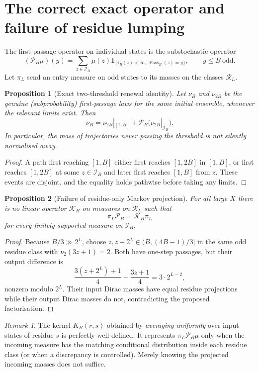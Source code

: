 \documentclass[10pt]{amsart}
\newtheorem{proposition}{Proposition}
\theoremstyle{definition}\newtheorem{definition}{Definition}
\theoremstyle{remark}\newtheorem{remark}{Remark}
\newcommand{\Pass}{\operatorname{Pass}}
\newcommand{\one}{\mathbf 1}
\newcommand{\cI}{\mathcal I}
\newcommand{\cR}{\mathcal R}
\newcommand{\cP}{\mathcal P}
\begin{document}
\section{The correct exact operator and failure of residue lumping}
The first-passage operator on individual states is the substochastic operator
\begin{equation}\label{eq:fulloperator}
 (\cP_B\mu)(y)=\sum_{z\in\cI_B}\mu(z)
 \one_{\{\tau_B(z)<\infty,\ \Pass_B(z)=y\}},\qquad y\le B\ \mathrm{odd}.
\end{equation}
Let $\pi_L$ send an entry measure on odd states to its masses on the classes $\cR_L$.

\begin{proposition}[Exact two-threshold renewal identity]\label{prop:renew}
Let $\nu_B$ and $\nu_{2B}$ be the genuine (subprobability) first-passage laws for the same initial ensemble, whenever the relevant limits exist. Then
\begin{equation}\label{eq:renew}
 \nu_B=\nu_{2B}|_{[1,B]}+\cP_B\bigl(\nu_{2B}|_{\cI_B}\bigr).
\end{equation}
In particular, the mass of trajectories never passing the threshold is not silently normalised away.
\end{proposition}
\begin{proof}
A path first reaching $[1,B]$ either first reaches $[1,2B]$ in $[1,B]$, or first reaches $[1,2B]$ at some $z\in\cI_B$ and later first reaches $[1,B]$ from $z$. These events are disjoint, and the equality holds pathwise before taking any limits.
\end{proof}

\begin{proposition}[Failure of residue-only Markov projection]\label{prop:lump}
For all large $X$ there is no linear operator $\mathcal K_B$ on measures on $\cR_L$ such that
\[
 \pi_L\cP_B=\mathcal K_B\pi_L
\]
for every finitely supported measure on $\cI_B$.
\end{proposition}
\begin{proof}
Because $B/3\gg 2^L$, choose $z,z+2^L\in(B,(4B-1)/3]$ in the same odd residue class with $\nu_2(3z+1)=2$. Both have one-step passages, but their output difference is
\[
 \frac{3(z+2^L)+1}{4}-\frac{3z+1}{4}=3\cdot2^{L-2},
\]
nonzero modulo $2^L$. Their input Dirac masses have equal residue projections while their output Dirac masses do not, contradicting the proposed factorisation.
\end{proof}
\begin{remark}
The kernel $K_B(r,s)$ obtained by \emph{averaging uniformly} over input states of residue $s$ is perfectly well-defined. It represents $\pi_L\cP_B\mu$ only when the incoming measure has the matching conditional distribution inside each residue class (or when a discrepancy is controlled). Merely knowing the projected incoming masses does not suffice.
\end{remark}
\end{document}
